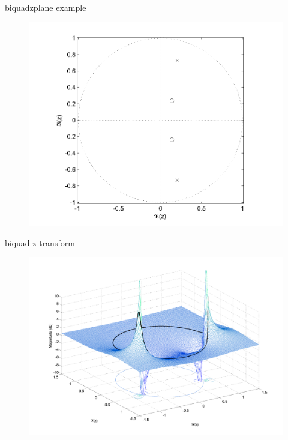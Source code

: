 		\begin{frame}{biquad}{zplane example}
            \vspace{-3mm}
				\begin{figure}[!hbt]
					\begin{center}
						\includegraphics[scale=.6]{graph/PoleZero}
					\end{center}
				\end{figure}
		\end{frame}
		\begin{frame}{biquad}{ z-transform}
            \vspace{-3mm}
				\begin{figure}[!hbt]
					\begin{center}
						\includegraphics[scale=.26]{graph/PoleZero3d}
					\end{center}
				\end{figure}
 		\end{frame}
